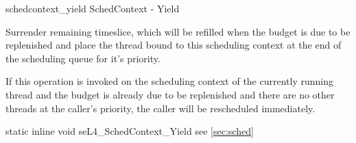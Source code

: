 %
%
%
%

\apidoc
{schedcontext_yield}
{SchedContext - Yield}
{Surrender remaining timeslice, which will be refilled when the budget is due to be replenished and place the thread bound to this scheduling context at the end of the scheduling queue for it's priority. 

If this operation is invoked on the scheduling context of the currently running thread and the budget is already due to be replenished and there are no other threads at the caller's priority, the caller will be rescheduled immediately.}
{static inline void seL4\_SchedContext\_Yield}
{
}
{\errorenumdesc}
{see \autoref{sec:sched}}

